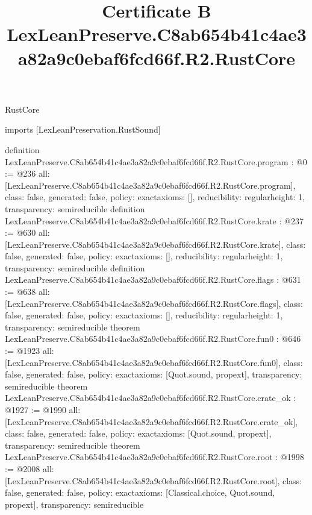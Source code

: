 \begin{lexlean}{RustCore}
\title{Certificate B LexLeanPreserve.C8ab654b41c4ae3a82a9c0ebaf6fcd66f.R2.RustCore}
\begin{coremodule}
imports [LexLeanPreservation.RustSound]

definition LexLeanPreserve.C8ab654b41c4ae3a82a9c0ebaf6fcd66f.R2.RustCore.program : @0 := @236 {
  all: [LexLeanPreserve.C8ab654b41c4ae3a82a9c0ebaf6fcd66f.R2.RustCore.program],
  class: false,
  generated: false,
  policy: exact{axioms: []},
  reducibility: regular{height: 1},
  transparency: semireducible
}
definition LexLeanPreserve.C8ab654b41c4ae3a82a9c0ebaf6fcd66f.R2.RustCore.krate : @237 := @630 {
  all: [LexLeanPreserve.C8ab654b41c4ae3a82a9c0ebaf6fcd66f.R2.RustCore.krate],
  class: false,
  generated: false,
  policy: exact{axioms: []},
  reducibility: regular{height: 1},
  transparency: semireducible
}
definition LexLeanPreserve.C8ab654b41c4ae3a82a9c0ebaf6fcd66f.R2.RustCore.flags : @631 := @638 {
  all: [LexLeanPreserve.C8ab654b41c4ae3a82a9c0ebaf6fcd66f.R2.RustCore.flags],
  class: false,
  generated: false,
  policy: exact{axioms: []},
  reducibility: regular{height: 1},
  transparency: semireducible
}
theorem LexLeanPreserve.C8ab654b41c4ae3a82a9c0ebaf6fcd66f.R2.RustCore.fun0 : @646 := @1923 {
  all: [LexLeanPreserve.C8ab654b41c4ae3a82a9c0ebaf6fcd66f.R2.RustCore.fun0],
  class: false,
  generated: false,
  policy: exact{axioms: [Quot.sound, propext]},
  transparency: semireducible
}
theorem LexLeanPreserve.C8ab654b41c4ae3a82a9c0ebaf6fcd66f.R2.RustCore.crate_ok : @1927 := @1990 {
  all: [LexLeanPreserve.C8ab654b41c4ae3a82a9c0ebaf6fcd66f.R2.RustCore.crate_ok],
  class: false,
  generated: false,
  policy: exact{axioms: [Quot.sound, propext]},
  transparency: semireducible
}
theorem LexLeanPreserve.C8ab654b41c4ae3a82a9c0ebaf6fcd66f.R2.RustCore.root : @1998 := @2008 {
  all: [LexLeanPreserve.C8ab654b41c4ae3a82a9c0ebaf6fcd66f.R2.RustCore.root],
  class: false,
  generated: false,
  policy: exact{axioms: [Classical.choice, Quot.sound, propext]},
  transparency: semireducible
}


\end{coremodule}
\end{lexlean}
